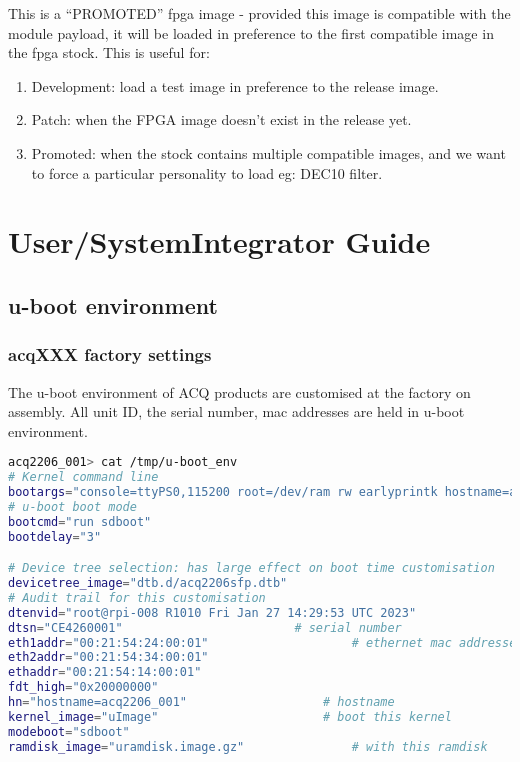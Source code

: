 \documentclass[]{article}
\begin{document}
This is a “PROMOTED” fpga image - provided this image is compatible with the module payload, it will be loaded in preference to the first compatible image in the fpga stock. This is useful for:
\begin{enumerate}
    \item Development: load a test image in preference to the release image.
    \item Patch: when the FPGA image doesn’t exist in the release yet.
    \item Promoted: when the stock contains multiple compatible images, and we want to force a particular personality to load eg: DEC10 filter.
\end{enumerate}

\pagebreak
\section{User/SystemIntegrator Guide}

\subsection{u-boot environment}

\subsubsection{acqXXX factory settings}

The u-boot environment of ACQ products are customised at the factory on assembly.
All unit ID, the serial number, mac addresses are held in u-boot environment.

\begin{lstlisting}[language=bash,style=bashstyle,frame=single]
acq2206_001> cat /tmp/u-boot_env 
# Kernel command line
bootargs="console=ttyPS0,115200 root=/dev/ram rw earlyprintk hostname=acq2206_001" 
# u-boot boot mode
bootcmd="run sdboot"
bootdelay="3"

# Device tree selection: has large effect on boot time customisation
devicetree_image="dtb.d/acq2206sfp.dtb"
# Audit trail for this customisation
dtenvid="root@rpi-008 R1010 Fri Jan 27 14:29:53 UTC 2023"
dtsn="CE4260001"						# serial number
eth1addr="00:21:54:24:00:01"					# ethernet mac addresses
eth2addr="00:21:54:34:00:01"
ethaddr="00:21:54:14:00:01"
fdt_high="0x20000000"
hn="hostname=acq2206_001"					# hostname
kernel_image="uImage"						# boot this kernel
modeboot="sdboot"
ramdisk_image="uramdisk.image.gz"				# with this ramdisk
\end{lstlisting}
\end{document}
